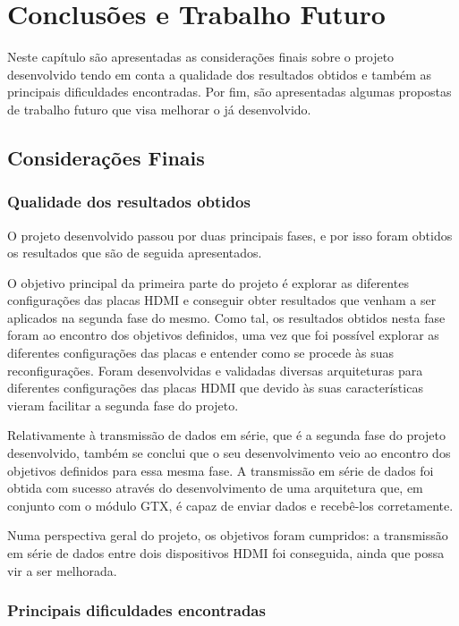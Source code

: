 \chapter{Conclusões e Trabalho Futuro} \label{chap:concl}

Neste capítulo são apresentadas as considerações finais sobre o projeto desenvolvido tendo em conta a qualidade dos resultados obtidos e também as principais dificuldades encontradas. Por fim, são apresentadas algumas propostas de trabalho futuro que visa melhorar o já desenvolvido.

\section{Considerações Finais} \label{chap6:cons_final}

\subsection*{Qualidade dos resultados obtidos}

O projeto desenvolvido passou por duas principais fases, e por isso foram obtidos os resultados que são de seguida apresentados.

O objetivo principal da primeira parte do projeto é explorar as diferentes configurações das placas HDMI e conseguir obter resultados que venham a ser aplicados na segunda fase do mesmo. Como tal, os resultados obtidos nesta fase foram ao encontro dos objetivos definidos, uma vez que foi possível explorar as diferentes configurações das placas e entender como se procede às suas reconfigurações. Foram desenvolvidas e validadas diversas arquiteturas para diferentes configurações das placas HDMI que devido às suas características vieram facilitar a segunda fase do projeto.

Relativamente à transmissão de dados em série, que é a segunda fase do projeto desenvolvido, também se conclui que o seu desenvolvimento veio ao encontro dos objetivos definidos para essa mesma fase. A transmissão em série de dados foi obtida com sucesso através do desenvolvimento de uma arquitetura que, em conjunto com o módulo GTX, é capaz de enviar dados e recebê-los corretamente.

Numa perspectiva geral do projeto, os objetivos foram cumpridos: a transmissão em série de dados entre dois dispositivos HDMI foi conseguida, ainda que possa vir a ser melhorada. 

\subsection*{Principais dificuldades encontradas}

